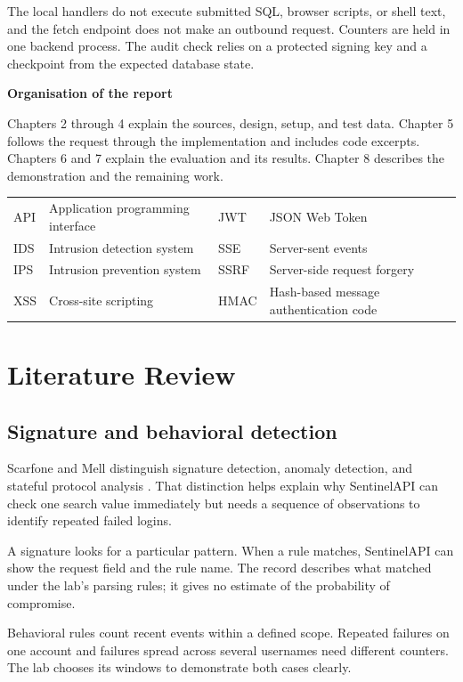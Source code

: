 \documentclass[11pt,a4paper,oneside]{report}
\newcommand{\topic}[1]{\par\addvspace{4pt}\noindent\textbf{#1}\par\nobreak\vspace{-.20em}}
\newcommand{\tabletitle}[1]{\par\addvspace{6pt}\noindent\parbox{\linewidth}{\captionof{table}{#1}}\par\nobreak}
\begin{document}
The local handlers do not execute submitted SQL, browser scripts, or shell text, and the fetch endpoint does not make an outbound request. Counters are held in one backend process. The audit check relies on a protected signing key and a checkpoint from the expected database state.

\topic{Organisation of the report}
Chapters 2 through 4 explain the sources, design, setup, and test data. Chapter 5 follows the request through the implementation and includes code excerpts. Chapters 6 and 7 explain the evaluation and its results. Chapter 8 describes the demonstration and the remaining work.

\medskip
\tabletitle{Abbreviations used in the report}
\begin{tabularx}{\linewidth}{@{}lYlY@{}}\toprule
API & Application programming interface & JWT & JSON Web Token\\
IDS & Intrusion detection system & SSE & Server-sent events\\
IPS & Intrusion prevention system & SSRF & Server-side request forgery\\
XSS & Cross-site scripting & HMAC & Hash-based message authentication code\\
\bottomrule\end{tabularx}

\chapter{Literature Review}
\section{Signature and behavioral detection}
Scarfone and Mell distinguish signature detection, anomaly detection, and stateful protocol analysis \cite{nist}. That distinction helps explain why SentinelAPI can check one search value immediately but needs a sequence of observations to identify repeated failed logins.

A signature looks for a particular pattern. When a rule matches, SentinelAPI can show the request field and the rule name. The record describes what matched under the lab's parsing rules; it gives no estimate of the probability of compromise.

Behavioral rules count recent events within a defined scope. Repeated failures on one account and failures spread across several usernames need different counters. The lab chooses its windows to demonstrate both cases clearly.
\end{document}
